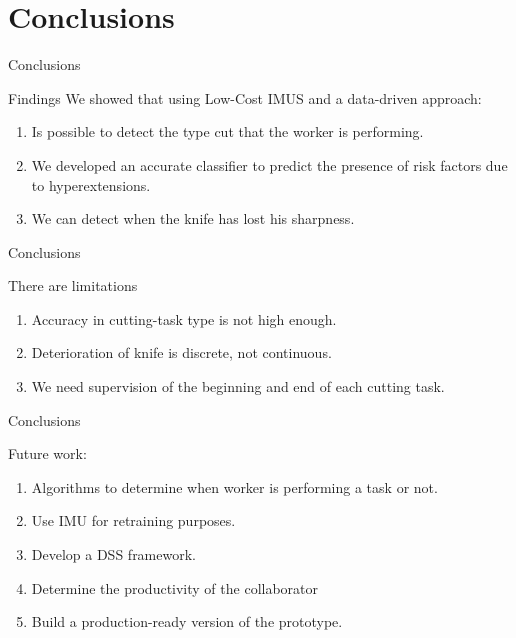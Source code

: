 
\section{Conclusions}
\frame{\sectionpage}

\begin{frame}{Conclusions}
    \begin{alertblock}{Findings}
        We showed that using Low-Cost IMUS and a data-driven approach:
        \begin{enumerate}
            \item Is possible to detect the type cut that the worker is performing.
            \item We developed an accurate classifier to predict the presence of risk factors due to hyperextensions.
            \item We can detect when the knife has lost his sharpness.
        \end{enumerate}
    \end{alertblock}
\end{frame}


\begin{frame}{Conclusions}
    \begin{alertblock}[Limitations]
        There are limitations
        \begin{enumerate}
        \item Accuracy in cutting-task type is not high enough.
        \item Deterioration of knife is discrete, not continuous.
        \item We need supervision of the beginning and end of each cutting task. 
        \end{enumerate}
    \end{alertblock}
\end{frame}

\begin{frame}{Conclusions}
    \begin{alertblock}
        Future work:
        \begin{enumerate}
            \item Algorithms to determine when worker is performing a task or not.
            \item Use IMU for retraining purposes.
            \item Develop a DSS framework.
            \item Determine the productivity of the collaborator
            \item Build a production-ready version of the prototype.
        \end{enumerate}
    \end{alertblock}
\end{frame}